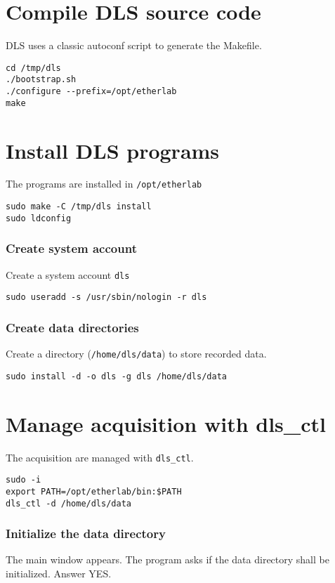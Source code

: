 \section{Compile DLS source code}

DLS uses a classic autoconf script to generate the Makefile.
\begin{verbatim}
cd /tmp/dls
./bootstrap.sh
./configure --prefix=/opt/etherlab
make
\end{verbatim}


\section{Install DLS programs}
The programs are installed in \texttt{/opt/etherlab} \\

\begin{verbatim}
sudo make -C /tmp/dls install
sudo ldconfig
\end{verbatim}

\subsubsection{Create system account}
Create a system account \texttt{dls}

\begin{verbatim}
sudo useradd -s /usr/sbin/nologin -r dls
\end{verbatim}


\subsubsection{Create data directories}

Create a directory (\texttt{/home/dls/data}) to store recorded data.
\begin{verbatim}
sudo install -d -o dls -g dls /home/dls/data
\end{verbatim} 


\section{Manage acquisition with dls\_ctl }

The acquisition are managed with \texttt{dls\_ctl}.

\begin{verbatim}
sudo -i
export PATH=/opt/etherlab/bin:$PATH
dls_ctl -d /home/dls/data
\end{verbatim}

\subsubsection{Initialize the data directory}
The main window appears. The program asks if the data directory
  shall be initialized. Answer YES.

